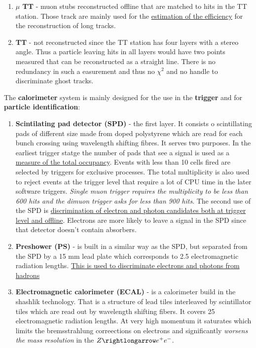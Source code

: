 \documentclass[11pt,a4paper,twoside]{article}
\begin{document}
\begin{enumerate}
\begin{enumerate}
            \item \textbf{$\mu$ TT} - muon stubs reconstructed offline that are matched to hits in the TT station. Those track are mainly used for the \underline{estimation of the efficiency} for the reconstruction of long tracks.
            
            \item \textbf{TT} - not reconstructed since the TT station has four layers with a stereo angle. Thus a particle leaving hits in all layers would have two points measured that can be reconstructed as a straight line. There is no redundancy in such a easurement and thus no $\chi^2$ and no handle to discriminate ghost tracks.
        \end{enumerate}

        The \textbf{calorimeter} system is mainly designed for the use in the \textbf{trigger} and for \textbf{particle identification}:
        \begin{enumerate}
            \item \textbf{Scintilating pad detector (SPD)} - the first layer. It consists o scintillating pads of different size made from doped polystyrene which are read for each bunch crossing using wavelength shifting fibres. It serves two purposes. In the earliest trigger statge the number of pads that see a signal is used as a \underline{measure of the total occupancy}. Events with less than 10 cells fired are selected by triggers for exclusive processes. The total multiplicity is also used to reject events at the trigger level that require a lot of CPU time in the later software triggers. \textit{Single muon trigger requires the multiplicity to be less than 600 hits and the dimuon trigger asks for less than 900 hits}. The second use of the SPD is \underline{discrimination of electron and photon candidates both at trigger level and offline}. Electrons are more likely to leave a signal in the SPD since that detector doesn't contain absorbers.
            
            \item \textbf{Preshower (PS)} - is built in a similar way as the SPD, but separated from the SPD by a 15 mm lead plate which corresponds to 2.5 electromagnetic radiation lengths. \underline{This is used to discriminate electrons and photons from hadrons}
            
            \item \textbf{Electromagnetic calorimeter (ECAL)} - is a calorimeter build in the shashlik technology. That is a structure of lead tiles interleaved by scintillator tiles which are read out by wavelength shifting fibers. It covers 25 electromagnetic radiation lengths. At very high momentum it saturates which limits the bremsstrahlung correections on electrons and significantly \textit{worsens the mass resolution} in the $Z \rightlongarrow e^{+} e^{-}$.
            

\end{enumerate}
\end{enumerate}
\end{document}
